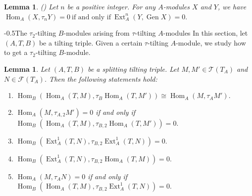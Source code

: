 \documentclass[reqno,12pt]{amsart}
\makeatletter
\numberwithin{equation}{section}
\theoremstyle{plain}
\newtheorem{lemma}[theorem]{\bf Lemma}
\theoremstyle{definition}
\renewcommand{\section}{\@startsection{section}{1}{0mm}
  {-\baselineskip}{0.5\baselineskip}{\bf\leftline}}
\makeatother
\begin{document}
\begin{lemma}\label{tau-gen} \textup{(\cite[Corollary 3.5(c)]{MAR})}
Let $n$ be a positive integer. For any $A$-modules $X$ and $Y$, we have
$\operatorname{Hom}_{A}(X, \tau_n Y) = 0~\text{if and only if}~\operatorname{Ext}_{A}^{n}(Y, \operatorname{Gen} X) = 0.$
\end{lemma}

\section{The $\tau_2$-tilting $B$-modules arising from $\tau$-tilting $A$-modules}
In this section, let \( (A, T, B) \) be a tilting triple. Given a certain $\tau$-tilting $A$-module, we study how to get a $\tau_2$-tilting $B$-module.
\begin{lemma}\label{3.1}
Let \( (A, T, B) \) be a splitting tilting triple. Let $M,M' \in \mathcal{T}(T_A)$ and $N \in \mathcal{F}(T_A)$. Then the following statements hold:
\begin{enumerate}
\item[(1)] \( \operatorname{Hom}_B ( \operatorname{Hom}_A(T,M) , \tau_{B}\operatorname{Hom}_A(T,M') ) \cong \operatorname{Hom}_A(M,\tau_A  M') .\)
\item[(2)] \(\operatorname{Hom}_A(M, \tau_{A,2} M') = 0\) if and only if
\(\operatorname{Hom}_B(\operatorname{Hom}_A(T, M),\tau_{B,2} \operatorname{Hom}_A(T, M')) = 0.\)
\item[(3)]\(\operatorname{Hom}_B(\operatorname{Ext}_A^1(T, N),\tau_{B,2} \operatorname{Ext}_A^1(T, N)) = 0.\)
\item[(4)]\(\operatorname{Hom}_B(\operatorname{Ext}_A^1(T, N), \tau_{B,2} \operatorname{Hom}_A(T, M)) = 0.\)
\item[(5)] \( \operatorname{Hom}_A(M,\tau_A N) = 0 \) if and only if \(\operatorname{Hom}_B(\operatorname{Hom}_A(T, M), \tau_{B,2} \operatorname{Ext}_A^1(T, N)) = 0.\)
\end{enumerate}
\end{lemma}
\end{document}
